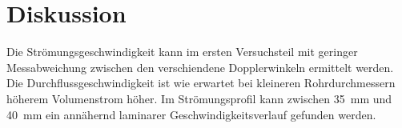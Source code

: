 \section{Diskussion}
\label{sec:Diskussion}

Die Strömungsgeschwindigkeit kann im ersten Versuchsteil mit geringer Messabweichung zwischen den verschiendene Dopplerwinkeln ermittelt werden. Die Durchflussgeschwindigkeit ist wie erwartet bei kleineren Rohrdurchmessern höherem Volumenstrom höher.
Im Strömungsprofil kann zwischen \SI{35}{mm} und \SI{40}{mm} ein annähernd laminarer Geschwindigkeitsverlauf gefunden werden.
